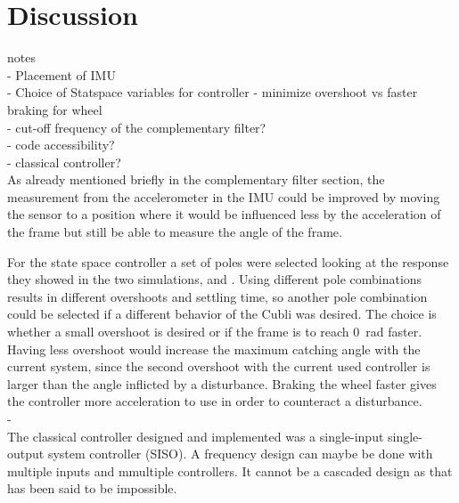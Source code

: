 \chapter{Discussion}

{\Large notes} \\
- Placement of IMU\\
- Choice of Statspace variables for controller - minimize overshoot vs faster braking for wheel\\
- cut-off frequency of the complementary filter?\\
- code accessibility?\\
- classical controller?\\


As already mentioned briefly in the complementary filter section, the measurement from the accelerometer in the IMU could be improved by moving the sensor to a position where it would be influenced less by the acceleration of the frame but still be able to measure the angle of the frame. 

For the state space controller a set of poles were selected looking at the response they showed in the two simulations,  and . Using different pole combinations results in different overshoots and settling time, so another pole combination could be selected if a different behavior of the Cubli was desired. The choice is whether a small overshoot is desired or if the frame is to reach \SI{0}{rad} faster. Having less overshoot would increase the maximum catching angle with the current system, since the second overshoot with the current used controller is larger than the angle inflicted by a disturbance. Braking the wheel faster gives the controller more acceleration to use in order to counteract a disturbance. 
\\-\\
The classical controller designed and implemented was a single-input single-output system controller (SISO). A frequency design can maybe be done with multiple inputs and mmultiple controllers. It cannot be a cascaded design as that has been said to be impossible. 
